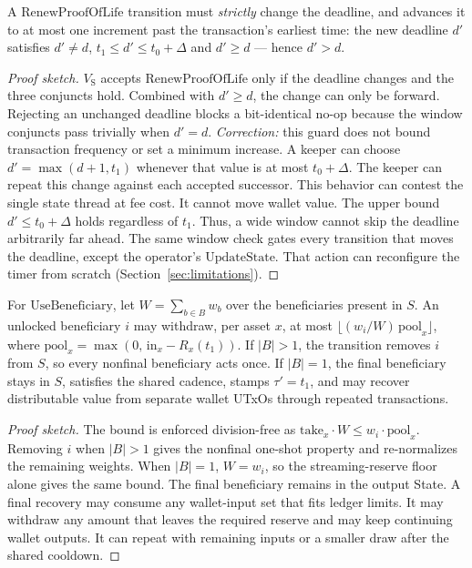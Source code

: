 \documentclass[11pt,DIV=11,parskip=half-]{scrartcl}
\begin{document}
\begin{theorem}
A $\mathrm{RenewProofOfLife}$ transition must \emph{strictly} change the deadline, and advances it to at most one increment past the transaction's earliest time: the new deadline $d'$ satisfies $d' \ne d$, $t_1 \le d' \le t_0 + \Delta$ and $d' \ge d$ --- hence $d' > d$.
\end{theorem}
\begin{proof}[Proof sketch]
$V_{\mathrm{S}}$ accepts $\mathrm{RenewProofOfLife}$ only if the deadline changes and the three conjuncts hold.
Combined with $d' \ge d$, the change can only be forward.
Rejecting an unchanged deadline blocks a bit-identical no-op because the window conjuncts pass trivially when $d'=d$.
\emph{Correction:} this guard does not bound transaction frequency or set a minimum increase.
A keeper can choose $d'=\max(d+1,t_1)$ whenever that value is at most $t_0+\Delta$.
The keeper can repeat this change against each accepted successor.
This behavior can contest the single state thread at fee cost. It cannot move wallet value.
The upper bound $d' \le t_0 + \Delta$ holds regardless of $t_1$.
Thus, a wide window cannot skip the deadline arbitrarily far ahead.
The same window check gates every transition that moves the deadline, except the operator's $\mathrm{UpdateState}$.
That action can reconfigure the timer from scratch (Section~\ref{sec:limitations}).
\end{proof}

\begin{theorem}
For $\mathrm{UseBeneficiary}$, let $W = \sum_{b \in B} w_b$ over the beneficiaries present in $S$. An unlocked beneficiary $i$ may withdraw, per asset $x$, at most $\big\lfloor (w_i / W)\, \mathrm{pool}_x \big\rfloor$, where $\mathrm{pool}_x = \max(0,\, \mathrm{in}_x - R_x(t_1))$. If $|B| > 1$, the transition removes $i$ from $S$, so every nonfinal beneficiary acts once. If $|B| = 1$, the final beneficiary stays in $S$, satisfies the shared cadence, stamps $\tau'=t_1$, and may recover distributable value from separate wallet UTxOs through repeated transactions.
\end{theorem}
\begin{proof}[Proof sketch]
The bound is enforced division-free as $\mathrm{take}_x \cdot W \le w_i \cdot \mathrm{pool}_x$. Removing $i$ when $|B| > 1$ gives the nonfinal one-shot property and re-normalizes the remaining weights. When $|B| = 1$, $W = w_i$, so the streaming-reserve floor alone gives the same bound. The final beneficiary remains in the output State. A final recovery may consume any wallet-input set that fits ledger limits. It may withdraw any amount that leaves the required reserve and may keep continuing wallet outputs. It can repeat with remaining inputs or a smaller draw after the shared cooldown.
\end{proof}
\end{document}
